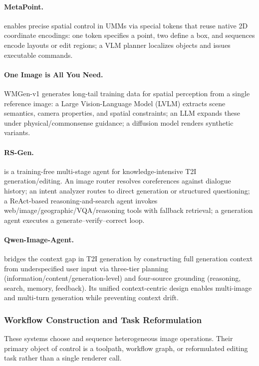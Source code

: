 \paragraph{MetaPoint.}
 enables precise spatial control in UMMs via special tokens that reuse native 2D coordinate encodings: one token specifies a point, two define a box, and sequences encode layouts or edit regions; a VLM planner localizes objects and issues executable commands. ~\cite{zhou2026metapoint}

\paragraph{One Image is All You Need.}
WMGen-v1 generates long-tail training data for spatial perception from a single reference image: a Large
Vision-Language Model (LVLM) extracts scene semantics, camera properties, and spatial constraints; an LLM expands these under physical/commonsense guidance; a diffusion model renders synthetic variants. ~\cite{avg260620764}

\paragraph{RS-Gen.}
 is a training-free multi-stage agent for knowledge-intensive T2I generation/editing. An image router resolves coreferences against dialogue history; an intent analyzer routes to direct generation or structured questioning; a ReAct-based reasoning-and-search agent invokes web/image/geographic/VQA/reasoning tools with fallback retrieval; a generation agent executes a generate–verify–correct loop. ~\cite{avg260623221}

\paragraph{Qwen-Image-Agent.}
 bridges the context gap in T2I generation by constructing full generation context from underspecified user input via three-tier planning (information/content/generation-level) and four-source grounding (reasoning, search, memory, feedback). Its unified context-centric design enables multi-image and multi-turn generation while preventing context drift.~\cite{avg260626907}

\subsubsection{Workflow Construction and Task Reformulation}
These systems choose and sequence heterogeneous image operations. Their primary object of control is a toolpath, workflow graph, or reformulated editing task rather than a single renderer call.

